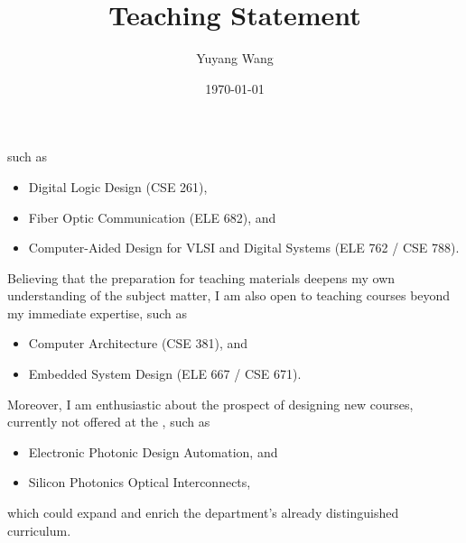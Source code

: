 



\title{Teaching Statement}

\def\courseOneName{Digital Logic Design}
\def\courseOneNumber{CSE 261}
\def\courseTwoName{Fiber Optic Communication}
\def\courseTwoNumber{ELE 682}
\def\courseThreeName{Computer-Aided Design for VLSI and Digital Systems}
\def\courseThreeNumber{ELE 762 / CSE 788}
\def\courseFourName{Computer Architecture}
\def\courseFourNumber{CSE 381}
\def\courseFiveName{Embedded System Design}
\def\courseFiveNumber{ELE 667 / CSE 671}
\def\courseSixName{Electronic Photonic Design Automation}
\def\courseSevenName{Silicon Photonics Optical Interconnects}

\def\rsCustom{%
such as 
\begin{itemize}[nosep]
    \item \courseOneName{} (\courseOneNumber{}),
    \item \courseTwoName{} (\courseTwoNumber{}), and
    \item \courseThreeName{} (\courseThreeNumber{}).
\end{itemize}
Believing that the preparation for teaching materials deepens my own understanding of the subject matter, I am also open to teaching courses beyond my immediate expertise, such as
\begin{itemize}[nosep]
    \item \courseFourName{} (\courseFourNumber{}), and
    \item \courseFiveName{} (\courseFiveNumber{}).
\end{itemize}
Moreover, I am enthusiastic about the prospect of designing new courses, currently not offered at the \appSchool{}, such as
\begin{itemize}[nosep]
    \item \courseSixName{}, and 
    \item \courseSevenName{},
\end{itemize}
which could expand and enrich the department's already distinguished curriculum.
}

\author{Yuyang Wang}
\date{\today}
\makeatletter
\fancyfoot[L]{\scshape \MakeLowercase{\@author}}
\fancyfoot[R]{{\scshape \MakeLowercase{\@title}}\quad{\LARGE\sfrac{\thepage}{\pageref*{LastPage}}}}
\makeatother



\maketitle%
\thispagestyle{fancy}


\rsCustom{}


\footnotesize


